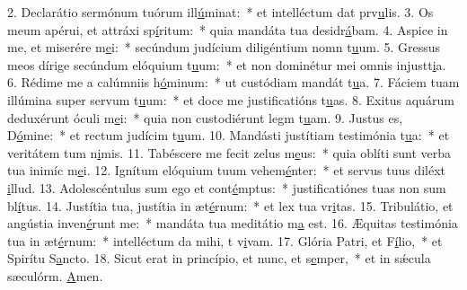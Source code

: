 2. Declarátio sermónum tuórum ill\uline{ú}minat:~* et intelléctum dat prv\uline{u}lis.
3. Os meum apérui, et attráxi sp\uline{í}ritum:~* quia mandáta tua desidr\uline{á}bam.
4. Aspice in me, et miserére m\uline{e}i:~* secúndum judícium diligéntium nomn t\uline{u}um.
5. Gressus meos dírige secúndum elóquium t\uline{u}um:~* et non dominétur mei omnis injustt\uline{i}a.
6. Rédime me a calúmniis h\uline{ó}minum:~* ut custódiam mandát t\uline{u}a.
7. Fáciem tuam illúmina super servum t\uline{u}um:~* et doce me justificatións t\uline{u}as.
8. Exitus aquárum deduxérunt óculi m\uline{e}i:~* quia non custodiérunt legm t\uline{u}am.
9. Justus es, D\uline{ó}mine:~* et rectum judícim t\uline{u}um.
10. Mandásti justítiam testimónia t\uline{u}a:~* et veritátem tum n\uline{i}mis.
11. Tabéscere me fecit zelus m\uline{e}us:~* quia oblíti sunt verba tua inimíc m\uline{e}i.
12. Ignítum elóquium tuum vehem\uline{é}nter:~* et servus tuus diléxt \uline{i}llud.
13. Adolescéntulus sum ego et cont\uline{é}mptus:~* justificatiónes tuas non sum bl\uline{í}tus.
14. Justítia tua, justítia in æt\uline{é}rnum:~* et lex tua vr\uline{i}tas.
15. Tribulátio, et angústia inven\uline{é}runt me:~* mandáta tua meditátio m\uline{a} est.
16. Æquitas testimónia tua in æt\uline{é}rnum:~* intelléctum da mihi, t v\uline{i}vam.
17. Glória Patri, et F\uline{í}lio,~* et Spirítu S\uline{a}ncto.
18. Sicut erat in princípio, et nunc, et s\uline{e}mper,~* et in sǽcula sæculórm. \uline{A}men.
